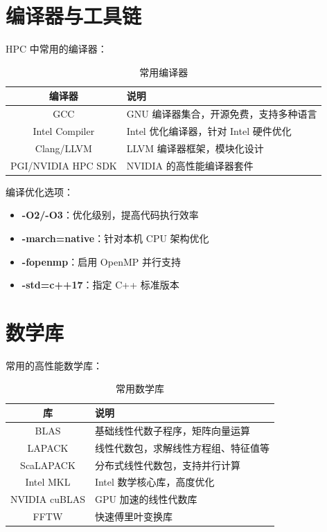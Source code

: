 \documentclass[12pt,UTF8]{ctexbook}
\begin{document}
\section{编译器与工具链}
\label{sec:compiler_toolchain}

HPC 中常用的编译器：

\begin{table}[htbp]
    \centering
    \caption{常用编译器}
    \begin{tabular}{|c|p{8cm}|}
        \hline
        \textbf{编译器} & \textbf{说明} \\
        \hline
        GCC & GNU 编译器集合，开源免费，支持多种语言 \\
        \hline
        Intel Compiler & Intel 优化编译器，针对 Intel 硬件优化 \\
        \hline
        Clang/LLVM & LLVM 编译器框架，模块化设计 \\
        \hline
        PGI/NVIDIA HPC SDK & NVIDIA 的高性能编译器套件 \\
        \hline
    \end{tabular}
\end{table}

编译优化选项：
\begin{itemize}
    \item \textbf{-O2/-O3}：优化级别，提高代码执行效率
    \item \textbf{-march=native}：针对本机 CPU 架构优化
    \item \textbf{-fopenmp}：启用 OpenMP 并行支持
    \item \textbf{-std=c++17}：指定 C++ 标准版本
\end{itemize}

\section{数学库}
\label{sec:math_libraries}

常用的高性能数学库：

\begin{table}[htbp]
    \centering
    \caption{常用数学库}
    \begin{tabular}{|c|p{8cm}|}
        \hline
        \textbf{库} & \textbf{说明} \\
        \hline
        BLAS & 基础线性代数子程序，矩阵向量运算 \\
        \hline
        LAPACK & 线性代数包，求解线性方程组、特征值等 \\
        \hline
        ScaLAPACK & 分布式线性代数包，支持并行计算 \\
        \hline
        Intel MKL & Intel 数学核心库，高度优化 \\
        \hline
        NVIDIA cuBLAS & GPU 加速的线性代数库 \\
        \hline
        FFTW & 快速傅里叶变换库 \\
        \hline
    \end{tabular}
\end{table}
\end{document}
